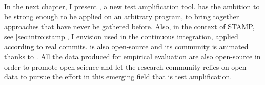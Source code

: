 In the next chapter, I present \dspot, a new test amplification tool.
\dspot has the ambition to be strong enough to be applied on an arbitrary program, to bring together approaches that have never be gathered before.
Also, in the context of STAMP, see \autoref{sec:intro:stamp}, I envision \dspot used in the continuous integration, applied according to real commits.
\dspot is also open-source and its community is animated thanks to \gh.
All the data produced for empirical evaluation are also open-source in order to promote open-science and let the research community relies on open-data to pursue the effort in this emerging field that is test amplification.